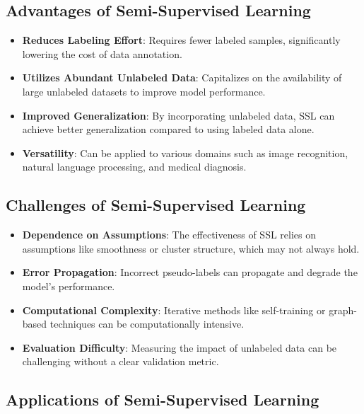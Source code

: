 \subsection*{Advantages of Semi-Supervised Learning}

\begin{itemize}
    \item \textbf{Reduces Labeling Effort}:
    Requires fewer labeled samples, significantly lowering the cost of data annotation.
    \item \textbf{Utilizes Abundant Unlabeled Data}:
    Capitalizes on the availability of large unlabeled datasets to improve model performance.
    \item \textbf{Improved Generalization}:
    By incorporating unlabeled data, SSL can achieve better generalization compared to using labeled data alone.
    \item \textbf{Versatility}:
    Can be applied to various domains such as image recognition, natural language processing, and medical diagnosis.
\end{itemize}

\subsection*{Challenges of Semi-Supervised Learning}

\begin{itemize}
    \item \textbf{Dependence on Assumptions}:
    The effectiveness of SSL relies on assumptions like smoothness or cluster structure, which may not always hold.
    \item \textbf{Error Propagation}:
    Incorrect pseudo-labels can propagate and degrade the model’s performance.
    \item \textbf{Computational Complexity}:
    Iterative methods like self-training or graph-based techniques can be computationally intensive.
    \item \textbf{Evaluation Difficulty}:
    Measuring the impact of unlabeled data can be challenging without a clear validation metric.
\end{itemize}

\subsection*{Applications of Semi-Supervised Learning}

